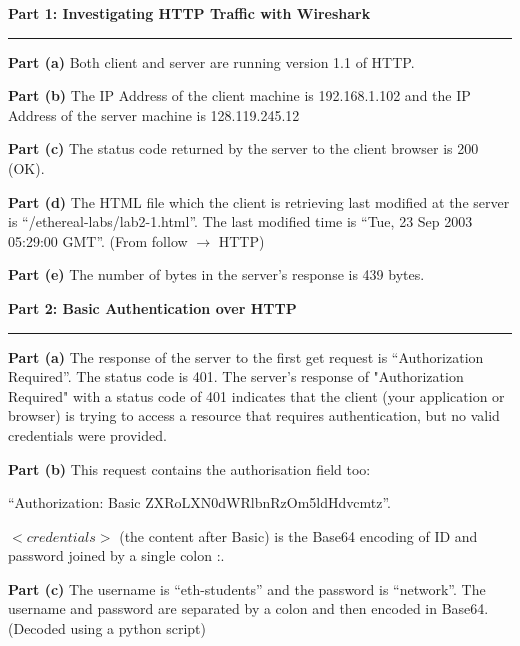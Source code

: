 \documentclass[a4paper,12pt]{article}
\title{\cooltitle{CS378 Lab-6 Report}}
\author{
    {\bf Saksham Rathi (22B1003)} \\ 
    Department of Computer Science, IIT Bombay \\
}
\date{}
\newenvironment{solution}[2][]{%
    \begin{mdframed}[linecolor=blue!70!black, linewidth=2pt, roundcorner=10pt, backgroundcolor=yellow!10!white, skipabove=12pt, skipbelow=12pt]%
        \textbf{\large #2}
        \par\noindent\rule{\textwidth}{0.4pt}
}{
    \end{mdframed}
}
\begin{document}
\maketitle

\begin{solution}{Part 1: Investigating HTTP Traffic with Wireshark}

\textbf{Part (a)} Both client and server are running version 1.1 of HTTP.

\textbf{Part (b)} The IP Address of the client machine is 192.168.1.102 and the IP Address of the server machine is 128.119.245.12

\textbf{Part (c)} The status code returned by the server to the client browser is 200 (OK).

\textbf{Part (d)} The HTML file which the client is retrieving last modified at the server is ``/ethereal-labs/lab2-1.html''. The last modified time is ``Tue, 23 Sep 2003 05:29:00 GMT''. (From follow $\rightarrow$ HTTP)

\textbf{Part (e)} The number of bytes in the server's response is 439 bytes.
\end{solution}

\begin{solution}{Part 2: Basic Authentication over HTTP}

    \textbf{Part (a)} The response of the server to the first get request is ``Authorization Required''. The status code is 401. The server's response of "Authorization Required" with a status code of 401 indicates that the client (your application or browser) is trying to access a resource that requires authentication, but no valid credentials were provided.

    \textbf{Part (b)} This request contains the authorisation field too: 
    
    ``Authorization: Basic ZXRoLXN0dWRlbnRzOm5ldHdvcmtz''. 
    
    $<credentials>$ (the content after Basic) is the Base64 encoding of ID and password joined by a single colon :.

    \textbf{Part (c)} The username is ``eth-students'' and the password is ``network''. The username and password are separated by a colon and then encoded in Base64. (Decoded using a python script)
\end{solution}
\end{document}
